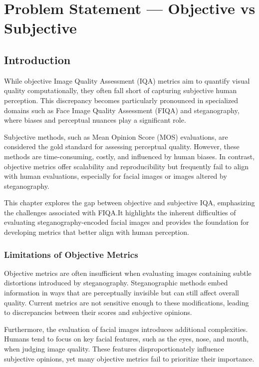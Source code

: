 \chapter{Problem Statement --- Objective vs Subjective}

\section{Introduction}

While objective Image Quality Assessment (IQA) metrics aim to quantify visual quality computationally, they often fall short of capturing subjective human perception. This discrepancy becomes particularly pronounced in specialized domains such as Face Image Quality Assessment (FIQA) and steganography, where biases and perceptual nuances play a significant role.

Subjective methods, such as Mean Opinion Score (MOS) evaluations, are considered the gold standard for assessing perceptual quality. However, these methods are time-consuming, costly, and influenced by human biases. In contrast, objective metrics offer scalability and reproducibility but frequently fail to align with human evaluations, especially for facial images or images altered by steganography.

This chapter explores the gap between objective and subjective IQA, emphasizing the challenges associated with FIQA.\@ It highlights the inherent difficulties of evaluating steganography-encoded facial images and provides the foundation for developing metrics that better align with human perception.

\subsection{Limitations of Objective Metrics}

Objective metrics are often insufficient when evaluating images containing subtle distortions introduced by steganography. Steganographic methods embed information in ways that are perceptually invisible but can still affect overall quality. Current metrics are not sensitive enough to these modifications, leading to discrepancies between their scores and subjective opinions.

Furthermore, the evaluation of facial images introduces additional complexities. Humans tend to focus on key facial features, such as the eyes, nose, and mouth, when judging image quality. These features disproportionately influence subjective opinions, yet many objective metrics fail to prioritize their importance.

